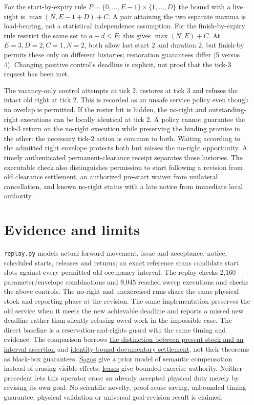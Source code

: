 \documentclass[11pt]{article}
\begin{document}
For the start-by-expiry rule $P=\{0,\ldots,E-1\}\times\{1,\ldots,D\}$ the bound with a live right is $\max(N,E-1+D)+C$. A pair attaining the two separate maxima is load-bearing, not a statistical independence assumption. For the finish-by-expiry rule restrict the same set to $a+d\le E$; this gives $\max(N,E)+C$. At $E=3,D=2,C=1,N=2$, both allow last start 2 and duration 2, but finish-by permits these only on different histories; restoration guarantees differ (5 versus 4). Changing positive control's deadline is explicit, not proof that the tick-3 request has been met.

The vacancy-only control attempts at tick 2, restores at tick 3 and refuses the intact old right at tick 2. This is recorded as an unsafe service policy even though no overlap is permitted. If the roster bit is hidden, the no-right and outstanding-right executions can be locally identical at tick 2. A policy cannot guarantee the tick-3 return on the no-right execution while preserving the binding promise in the other: the necessary tick-2 action is common to both. Waiting according to the admitted right envelope protects both but misses the no-right opportunity. A timely authenticated permanent-clearance receipt separates those histories. The executable check also distinguishes permission to start following a revision from old clearance settlement, an authorized pre-start waiver from unilateral cancellation, and known no-right status with a late notice from immediate local authority.

\section{Evidence and limits}
\texttt{replay.py} models actual forward movement, issue and acceptance, notice, scheduled starts, releases and returns; an exact reference scans candidate start slots against every permitted old occupancy interval. The replay checks 2,160 parameter/envelope combinations and 9,045 reached sweep executions and checks the above controls. The no-right and unexercised runs share the same physical stock and reporting phase at the revision. The same implementation preserves the old service when it meets the new achievable deadline and reports a missed new deadline rather than silently refusing owed work in the impossible case. The direct baseline is a reservation-and-rights guard with the same timing and evidence. The comparison borrows \href{https://github.com/eternal-november/eos-research-programmes/pull/354}{the distinction between present stock and an interval assertion} and \href{https://github.com/eternal-november/eos-research-programmes/pull/352}{identity-bound documentary settlement}, not their theorems as black-box guarantees. \href{https://www.cs.cornell.edu/andru/cs711/2002fa/reading/sagas.pdf}{Sagas} give a prior model of semantic compensation instead of erasing visible effects; \href{https://web.stanford.edu/class/archive/cs/cs240/cs240.1076/readings/89-leases.pdf}{leases} give bounded exercise authority. Neither precedent lets this operator erase an already accepted physical duty merely by revising its own goal. No scientific novelty, proof-reuse saving, unbounded timing guarantee, physical validation or universal goal-revision result is claimed.
\end{document}
